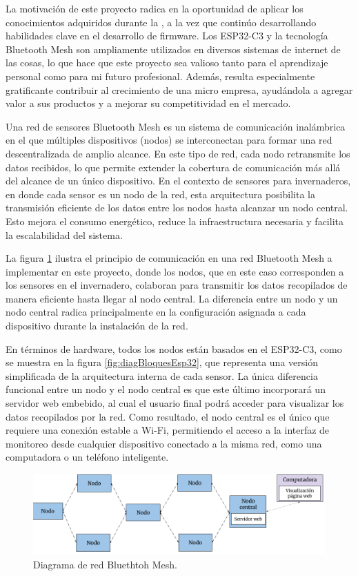 \documentclass[
11pt, %
]{charter}
\begin{document}
La motivación de este proyecto radica en la oportunidad de aplicar los conocimientos adquiridos durante la {\degreename}, a la vez que continúo desarrollando habilidades clave en el desarrollo de firmware. Los ESP32-C3 y la tecnología Bluetooth Mesh son ampliamente utilizados en diversos sistemas de internet de las cosas, lo que hace que este proyecto sea valioso tanto para el aprendizaje personal como para mi futuro profesional. Además, resulta especialmente gratificante contribuir al crecimiento de una micro empresa, ayudándola a agregar valor a sus productos y a mejorar su competitividad en el mercado.

Una red de sensores Bluetooth Mesh es un sistema de comunicación inalámbrica en el que múltiples dispositivos (nodos) se interconectan para formar una red descentralizada de amplio alcance. En este tipo de red, cada nodo retransmite los datos recibidos, lo que permite extender la cobertura de comunicación más allá del alcance de un único dispositivo. En el contexto de sensores para invernaderos, en donde cada sensor es un nodo de la red, esta arquitectura posibilita la transmisión eficiente de los datos entre los nodos hasta alcanzar un nodo central. Esto mejora el consumo energético, reduce la infraestructura necesaria y facilita la escalabilidad del sistema.

La figura \ref{fig:diagBloquesBleMesh} ilustra el principio de comunicación en una red Bluetooth Mesh a implementar en este proyecto, donde los nodos, que en este caso corresponden a los sensores en el invernadero, colaboran para transmitir los datos recopilados de manera eficiente hasta llegar al nodo central. La diferencia entre un nodo y un nodo central radica principalmente en la configuración asignada a cada dispositivo durante la instalación de la red.

En términos de hardware, todos los nodos están basados en el ESP32-C3, como se muestra en la figura \ref{fig:diagBloquesEsp32}, que representa una versión simplificada de la arquitectura interna de cada sensor. La única diferencia funcional entre un nodo y el nodo central es que este último incorporará un servidor web embebido, al cual el usuario final podrá acceder para visualizar los datos recopilados por la red. Como resultado, el nodo central es el único que requiere una conexión estable a Wi-Fi, permitiendo el acceso a la interfaz de monitoreo desde cualquier dispositivo conectado a la misma red, como una computadora o un teléfono inteligente.

\begin{figure}[htpb]
\centering 
\includegraphics[width=.95\textwidth]{./Figuras/Diagrama-ble-mesh.png}
\caption{Diagrama de red Bluethtoh Mesh.}
\label{fig:diagBloquesBleMesh}
\end{figure}
\end{document}
